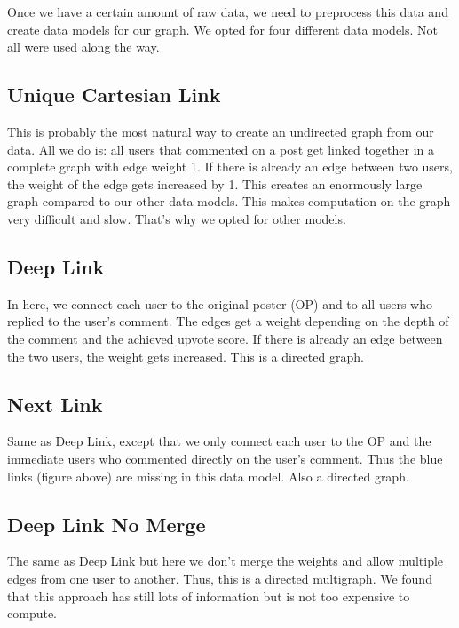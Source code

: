 Once we have a certain amount of raw data, we need to preprocess this data and create data models for our graph. We opted for four different data models. Not all were used along the way.

\subsection{Unique Cartesian Link}
This is probably the most natural way to create an undirected graph from our data. All we do is: all users that commented on a post get linked together in a complete graph with edge weight 1. If there is already an edge between two users, the weight of the edge gets increased by 1. This creates an enormously large graph compared to our other data models. This makes computation on the graph very difficult and slow. That's why we opted for other models.

\subsection{Deep Link}
In here, we connect each user to the original poster (OP) and to all users who replied to the user's comment. The edges get a weight depending on the depth of the comment and the achieved upvote score. If there is already an edge between the two users, the weight gets increased. This is a directed graph.





\subsection{Next Link}
Same as Deep Link, except that we only connect each user to the OP and the immediate users who commented directly on the user's comment. Thus the blue links (figure above) are missing in this data model. Also a directed graph.

\subsection{Deep Link No Merge}
The same as Deep Link but here we don't merge the weights and allow multiple edges from one user to another. Thus, this is a directed multigraph. We found that this approach has still lots of information but is not too expensive to compute.











